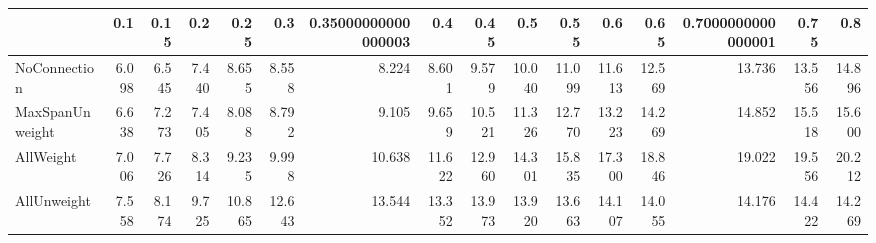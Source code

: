 \begin{tabular}{lrrrrrrrrrrrrrrr}
\toprule
{} &   0.1 &  0.15 &   0.2 &   0.25 &    0.3 & 0.35000000000000003 &    0.4 &   0.45 &    0.5 &   0.55 &    0.6 &   0.65 & 0.7000000000000001 &   0.75 &    0.8 \\
\midrule
NoConnection    & 6.098 & 6.545 & 7.440 &  8.655 &  8.558 &               8.224 &  8.601 &  9.579 & 10.040 & 11.099 & 11.613 & 12.569 &             13.736 & 13.556 & 14.896 \\
MaxSpanUnweight & 6.638 & 7.273 & 7.405 &  8.088 &  8.792 &               9.105 &  9.659 & 10.521 & 11.326 & 12.770 & 13.223 & 14.269 &             14.852 & 15.518 & 15.600 \\
AllWeight       & 7.006 & 7.726 & 8.314 &  9.235 &  9.998 &              10.638 & 11.622 & 12.960 & 14.301 & 15.835 & 17.300 & 18.846 &             19.022 & 19.556 & 20.212 \\
AllUnweight     & 7.558 & 8.174 & 9.725 & 10.865 & 12.643 &              13.544 & 13.352 & 13.973 & 13.920 & 13.663 & 14.107 & 14.055 &             14.176 & 14.422 & 14.269 \\
\bottomrule
\end{tabular}
